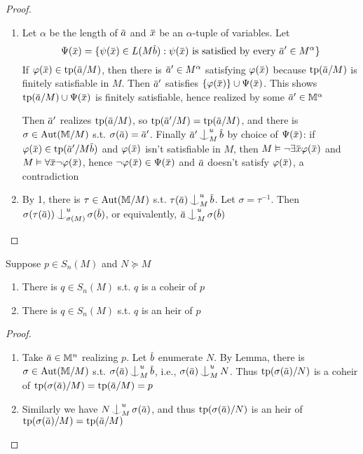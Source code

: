 \documentclass[11pt]{article}
\begin{document}
\begin{proof}
\begin{enumerate}
\item Let \(\alpha\) be the length of \(\bara\) and \(\barx\) be an \(\alpha\)-tuple of variables. Let
\begin{equation*}
\Psi(\barx)=\{\psi(\barx)\in L(M\barb):\psi(\barx)\text{ is satisfied by every }\bara'\in M^\alpha\}
\end{equation*}
If \(\varphi(\barx)\in\tp(\bara/M)\), then there is \(\bara'\in M^\alpha\) satisfying \(\varphi(\barx)\)
because \(\tp(\bara/M)\) is finitely satisfiable in \(M\). Then \(\bara'\)
satisfies \(\{\varphi(\barx)\}\cup\Psi(\barx)\). This shows \(\tp(\bara/M)\cup\Psi(\barx)\) is finitely
satisfiable, hence realized by some \(\bara'\in\M^\alpha\)

Then \(\bara'\) realizes \(\tp(\bara/M)\), so \(\tp(\bara'/M)=\tp(\bara/M)\), and there
is \(\sigma\in\operatorname{\text{Aut}}(\mathbb{M}/M)\) s.t. \(\sigma(\bara)=\bara'\). Finally \(\bara'\ind_M^u\barb\) by choice
of \(\Psi(\barx)\): if \(\varphi(\barx)\in\tp(\bara'/M\barb)\) and \(\varphi(\barx)\) isn't satisfiable
in \(M\), then \(M\vDash\neg\exists\barx\varphi(\barx)\) and \(M\vDash\forall\barx\neg\varphi(\barx)\), hence
 \(\neg\varphi(\barx)\in\Psi(\barx)\) and \(\bara\) doesn't satisfy \(\varphi(\barx)\), a contradiction

\item By 1, there is \(\tau\in\operatorname{\text{Aut}}(\mathbb{M}/M)\) s.t. \(\tau(\bara)\ind_M^u\barb\). Let \(\sigma=\tau^{-1}\).
Then \(\sigma(\tau(\bara))\ind_{\sigma(M)}^u\sigma(\barb)\), or equivalently, \(\bara\ind_M^u\sigma(\barb)\)
\end{enumerate}
\end{proof}

\begin{corollary}[]
Suppose \(p\in S_n(M)\) and \(N\succeq M\)
\begin{enumerate}
\item There is \(q\in S_n(M)\) s.t. \(q\) is a coheir of \(p\)
\item There is \(q\in S_n(M)\) s.t. \(q\) is an heir of \(p\)
\end{enumerate}
\end{corollary}

\begin{proof}
\begin{enumerate}
\item Take \(\bara\in\M^n\) realizing \(p\). Let \(\barb\) enumerate \(N\). By Lemma, there
is \(\sigma\in\operatorname{\text{Aut}}(\mathbb{M}/M)\) s.t. \(\sigma(\bara)\ind_M^u\barb\), i.e., \(\sigma(\bara)\ind_M^uN\).
Thus \(\tp(\sigma(\bara)/N)\) is a coheir of \(\tp(\sigma(\bara)/M)=\tp(\bara/M)=p\)
\item Similarly we have \(N\ind_M^u\sigma(\bara)\), and thus \(\tp(\sigma(\bara)/N)\) is an heir of \(\tp(\sigma(\bara)/M)=\tp(\bara/M)\)
\end{enumerate}
\end{proof}
\end{document}
